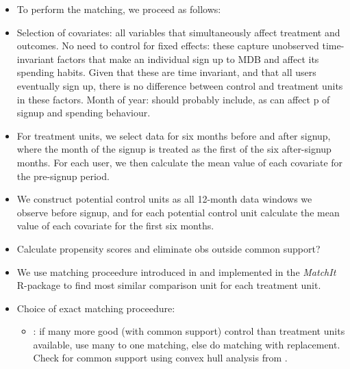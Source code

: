 \documentclass[a4paper, 11pt]{article}
\begin{document}
\begin{itemize}
    \item To perform the matching, we proceed as follows:

    \item Selection of covariates: all variables that simultaneously affect
        treatment and outcomes. No need to control for fixed effects: these
        capture unobserved time-invariant factors that make an individual sign
        up to MDB and affect its spending habits. Given that these are time
        invariant, and that all users eventually sign up, there is no
        difference between control and treatment units in these factors. Month
        of year: should probably include, as can affect p of signup and
        spending behaviour.

    \item For treatment units, we select data for six months before and after
        signup, where the month of the signup is treated as the first of the
        six after-signup months. For each user, we then calculate the mean
        value of each covariate for the pre-signup period.

    \item We construct potential control units as all 12-month data windows we
        observe before signup, and for each potential control unit calculate
        the mean value of each covariate for the first six months.


    \item Calculate propensity scores and eliminate obs outside common support?


    \item We use matching proceedure introduced in \citet{ho2007matching} and
        implemented in the \textit{MatchIt} R-package \citep{stuart2011matchit} to
        find most similar comparison unit for each treatment unit.

    \item Choice of exact matching proceedure:

        \begin{itemize}

            \item {}
                \citet{ho2007matching}: if many more good (with common support)
                control than treatment units available, use many to one
                matching, else do matching with replacement. Check for common
                support using convex hull analysis from
                \citet{king2006dangers}.


\end{itemize}
\end{itemize}
\end{document}
